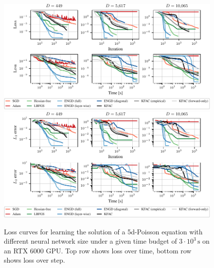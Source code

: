 \begin{figure}[!h]
  \centering
  \includegraphics{../kfac_pinns_exp/exp18_groupplot_poisson5d/loss_all.pdf}
  \\
  \includegraphics{../kfac_pinns_exp/exp18_groupplot_poisson5d/l2_error_all.pdf}
  \caption{Loss curves for learning the solution of a 5d-Poisson equation with different neural network size under a given time budget of $3\cdot 10^3\,\text{s}$ on an RTX 6000 GPU.
    Top row shows loss over time, bottom row shows loss over step.}
\end{figure}


